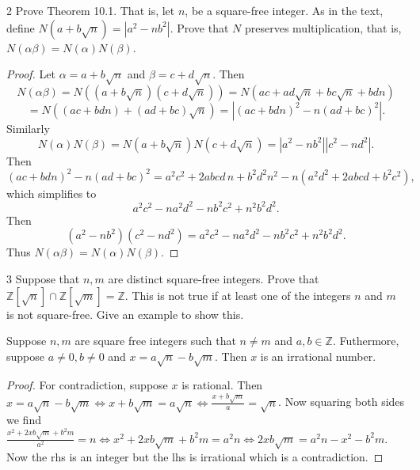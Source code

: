 \begin{problem}{2}
    Prove Theorem 10.1. That is, let $n$, be a square-free integer.
    As in the text, define $N(a + b\sqrt{n}) = |a^2 - nb^2|$.
    Prove that $N$ preserves multiplication, that is,
    $N(\alpha \beta) = N(\alpha) N(\beta)$.
\end{problem}
\solved

\begin{proof}
    Let $\alpha = a + b\sqrt{n}$ and $\beta = c + d\sqrt{n}$.
    Then
    \[
    N(\alpha \beta)
        = N((a + b\sqrt{n})(c + d\sqrt{n}))
        = N(ac + ad\sqrt{n} + bc\sqrt{n} + bdn)
    \]
    \[
        = N((ac + bdn) + (ad + bc)\sqrt{n})
        = |(ac + bdn)^2 - n(ad + bc)^2|.
    \]
    Similarly
    \[
    N(\alpha)N(\beta)
        = N(a + b\sqrt{n})N(c + d\sqrt{n})
        = |a^2 - nb^2||c^2 - nd^2|.
    \]
    Then
    \[
    (ac + bdn)^2 - n(ad + bc)^2
    = a^2c^2 + 2abcd\,n + b^2d^2n^2
    - n(a^2d^2 + 2abcd + b^2c^2),
    \]
    which simplifies to
    \[
    a^2c^2 - na^2d^2 - nb^2c^2 + n^2b^2d^2.
    \]
    Then
    \[
    (a^2 - nb^2)(c^2 - nd^2)
    = a^2c^2 - na^2d^2 - nb^2c^2 + n^2b^2d^2.
    \]
    Thus $N(\alpha\beta) = N(\alpha)N(\beta)$.
\end{proof}

\begin{problem}{3}
    Suppose that $n, m$ are distinct square-free integers.
    Prove that $\mathbb{Z}[\sqrt{n}] \cap \mathbb{Z}[\sqrt{m}] = \mathbb{Z}$.
    This is not true if at least one of the integers $n$ and $m$ is not 
    square-free. Give an example to show this.
\end{problem}
\solved


\begin{theorem}
    Suppose $n, m$ are square free integers such that $n \ne m$ and $a, b \in \mathbb{Z}$.
    Futhermore, suppose $a \ne 0, b \ne 0$ and $x = a\sqrt{n} - b\sqrt{m}$.
    Then $x$ is an irrational number.
\end{theorem}

\begin{proof}
    For contradiction, suppose $x$ is rational.
    Then $x = a\sqrt{n} - b \sqrt{m} \iff x + b\sqrt{m} = a \sqrt{n} \iff \frac{x + b\sqrt{m}}{a} = \sqrt{n}$.
    Now squaring both sides we find $\frac{x^2 + 2xb\sqrt{m} + b^2 m}{a^2} = n \iff x^2 + 2xb\sqrt{m} + b^2 m = a^2 n \iff 2xb\sqrt{m} = a^2 n - x^2 - b^2 m$.
    Now the rhs is an integer but the lhs is irrational which is a contradiction.
\end{proof}

